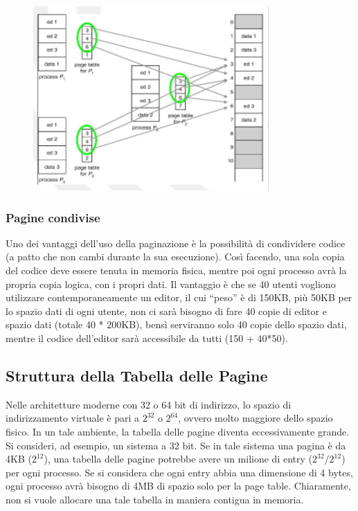 \documentclass[a4paper]{article}
\begin{document}
\begin{figure}
    \includegraphics[width=9cm]{img/pag_cond.JPG}
\end{figure}

\subsubsection{Pagine condivise}
Uno dei vantaggi dell'uso della paginazione è la possibilità di condividere codice (a patto che non cambi durante la sua esecuzione). Così facendo, una sola copia del codice deve essere tenuta in memoria fisica, mentre poi ogni processo avrà la propria copia logica, con i propri dati. Il vantaggio è che se 40 utenti vogliono utilizzare contemporaneamente un editor, il cui ``peso'' è di 150KB, più 50KB per lo spazio dati di ogni utente, non ci sarà bisogno di fare 40 copie di editor e spazio dati (totale 40 * 200KB), bensì serviranno solo 40 copie dello spazio dati, mentre il codice dell'editor sarà accessibile da tutti (150 + 40*50).

\subsection{Struttura della Tabella delle Pagine}
Nelle architetture moderne con 32 o 64 bit di indirizzo, lo spazio di indirizzamento virtuale è pari a $2^32$ o $2^64$, ovvero molto maggiore dello spazio fisico. In un tale ambiente, la tabella delle pagine diventa eccessivamente grande. Si consideri, ad esempio, un sistema a 32 bit. Se in tale sistema una pagina è da 4KB ($2^12$), una tabella delle pagine potrebbe avere un milione di entry ($2^32 / 2^12$) per ogni processo. Se si considera che ogni entry abbia una dimensione di 4 bytes, ogni processo avrà bisogno di 4MB di spazio solo per la page table. Chiaramente, non si vuole allocare una tale tabella in maniera contigua in memoria.
\end{document}
